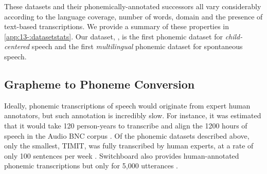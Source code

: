 %
These datasets and their phonemically-annotated successors all vary considerably according to the language coverage, number of words, domain and the presence of text-based transcriptions. We provide a summary of these properties in \cref{app:13-:datasetstats}. Our dataset, \ipachildes, is the first phonemic dataset for \emph{child-centered} speech and the first \emph{multilingual} phonemic dataset for spontaneous speech.%

\subsection{Grapheme to Phoneme Conversion}

Ideally, phonemic transcriptions of speech would originate from expert human annotators, but such annotation is incredibly slow. For instance, it was estimated that it would take 120 person-years to transcribe and align the 1200 hours of speech in the Audio BNC corpus \citep{coleman2011mining}. Of the phonemic datasets described above, only the smallest, TIMIT, was fully transcribed by human experts, at a rate of only 100 sentences per week \citep{zue1996transcription, lamel1989speech}. Switchboard also provides human-annotated phonemic transcriptions but only for 5,000 utterances \citep{greenberg1996insights}.

